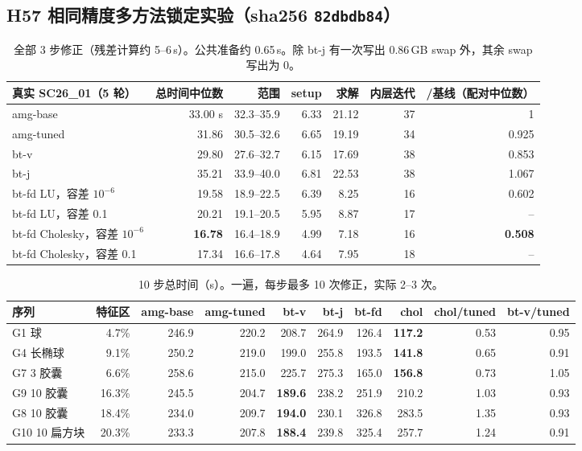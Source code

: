 \subsection{H57 相同精度多方法锁定实验（sha256 \texttt{82dbdb84}）}
\begin{table}[H]
\centering\small
\begin{tabular}{lrrrrrr}
\toprule
真实 SC26\_01（5 轮） & 总时间中位数 & 范围 & setup & 求解 & 内层迭代 & /基线（配对中位数）\\
\midrule
amg-base & 33.00 s & 32.3--35.9 & 6.33 & 21.12 & 37 & 1 \\
amg-tuned & 31.86 & 30.5--32.6 & 6.65 & 19.19 & 34 & 0.925 \\
bt-v & 29.80 & 27.6--32.7 & 6.15 & 17.69 & 38 & 0.853 \\
bt-j & 35.21 & 33.9--40.0 & 6.81 & 22.53 & 38 & 1.067 \\
bt-fd LU，容差 $10^{-6}$ & 19.58 & 18.9--22.5 & 6.39 & 8.25 & 16 & 0.602 \\
bt-fd LU，容差 0.1 & 20.21 & 19.1--20.5 & 5.95 & 8.87 & 17 & -- \\
bt-fd Cholesky，容差 $10^{-6}$ & \textbf{16.78} & 16.4--18.9 & 4.99 & 7.18 & 16 & \textbf{0.508} \\
bt-fd Cholesky，容差 0.1 & 17.34 & 16.6--17.8 & 4.64 & 7.95 & 18 & -- \\
\bottomrule
\end{tabular}
\caption{全部 3 步修正（残差计算约 5--6\,s）。公共准备约 0.65\,s。除 bt-j 有一次写出 0.86\,GB swap 外，其余 swap 写出为 0。}
\end{table}
\begin{table}[H]
\centering\footnotesize\setlength{\tabcolsep}{4pt}
\begin{tabular}{lrrrrrrrrr}
\toprule
序列 & 特征区 & amg-base & amg-tuned & bt-v & bt-j & bt-fd & chol & chol/tuned & bt-v/tuned \\
\midrule
G1 球 & 4.7\% & 246.9 & 220.2 & 208.7 & 264.9 & 126.4 & \textbf{117.2} & 0.53 & 0.95 \\
G4 长椭球 & 9.1\% & 250.2 & 219.0 & 199.0 & 255.8 & 193.5 & \textbf{141.8} & 0.65 & 0.91 \\
G7 3 胶囊 & 6.6\% & 258.6 & 215.0 & 225.7 & 275.3 & 165.0 & \textbf{156.8} & 0.73 & 1.05 \\
G9 10 胶囊 & 16.3\% & 245.5 & 204.7 & \textbf{189.6} & 238.2 & 251.9 & 210.2 & 1.03 & 0.93 \\
G8 10 胶囊 & 18.4\% & 234.0 & 209.7 & \textbf{194.0} & 230.1 & 326.8 & 283.5 & 1.35 & 0.93 \\
G10 10 扁方块 & 20.3\% & 233.3 & 207.8 & \textbf{188.4} & 239.8 & 325.4 & 257.7 & 1.24 & 0.91 \\
\bottomrule
\end{tabular}
\caption{10 步总时间（s）。一遍，每步最多 10 次修正，实际 2--3 次。}
\end{table}
